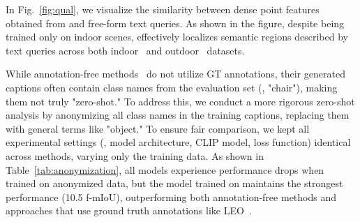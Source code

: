 In Fig.~\ref{fig:qual}, we visualize the similarity between dense point features obtained from \nickname and free-form text queries.
As shown in the figure, despite being trained only on indoor scenes, \nickname effectively localizes semantic regions described by text queries across both indoor~\cite{dai2017scannet} and outdoor~\cite{schops2017multi} datasets.



While annotation-free methods~\cite{yang2024regionplc,jiang2024open} do not utilize GT annotations, their generated captions often contain class names from the evaluation set (\eg, "chair"), making them not truly "zero-shot."
To address this, we conduct a more rigorous zero-shot analysis by anonymizing all class names in the training captions, replacing them with general terms like "object."
To ensure fair comparison, we kept all experimental settings (\eg, model architecture, CLIP model, loss function) identical across methods, varying only the training data.
As shown in Table~\ref{tab:anonymization}, all models experience performance drops when trained on anonymized data, but the model trained on \dataname maintains the strongest performance (10.5 f-mIoU), outperforming both annotation-free methods and approaches that use ground truth annotations like LEO~\cite{huangEmbodiedGeneralistAgent2023}.




